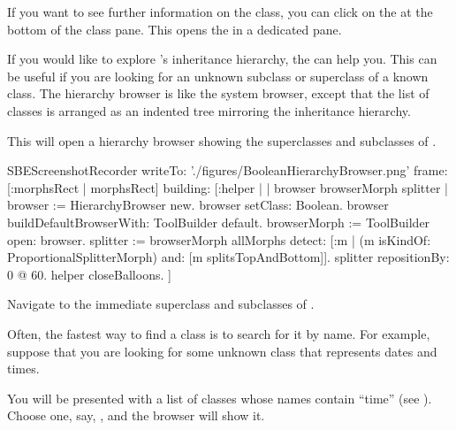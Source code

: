 \documentclass[a4paper,10pt,twoside]{book}
\begin{document}
If you want to see further information on the class, you can click on the  at the bottom of the class pane.
This opens the  in a dedicated pane.

If you would like to explore \sq's inheritance hierarchy, the  can help you.
This can be useful if you are looking for an unknown subclass or superclass of a known class.
The hierarchy browser is like the system browser, except that the list of classes is arranged as an indented tree mirroring the inheritance hierarchy.

\noindent
This will open a hierarchy browser showing the superclasses and subclasses of .

\begin{ExecuteSmalltalkScript}
SBEScreenshotRecorder writeTo: './figures/BooleanHierarchyBrowser.png' frame: [:morphsRect | morphsRect] building: [:helper | | browser browserMorph splitter |
	browser := HierarchyBrowser new.
	browser setClass: Boolean.
	browser buildDefaultBrowserWith: ToolBuilder default.
	browserMorph := ToolBuilder open: browser.
	splitter := browserMorph allMorphs detect: [:m |
		(m isKindOf: ProportionalSplitterMorph) and: [m splitsTopAndBottom]].
	splitter repositionBy: 0 @ 60.
	helper closeBalloons.
]
\end{ExecuteSmalltalkScript}

Navigate to the immediate superclass and subclasses of .

Often, the fastest way to find a class is to search for it by name.
For example, suppose that you are looking for some unknown class that represents dates and times.

\noindent
You will be presented with a list of classes whose names contain ``time'' (see ).
Choose one, say, , and the browser will show it.
\end{document}
